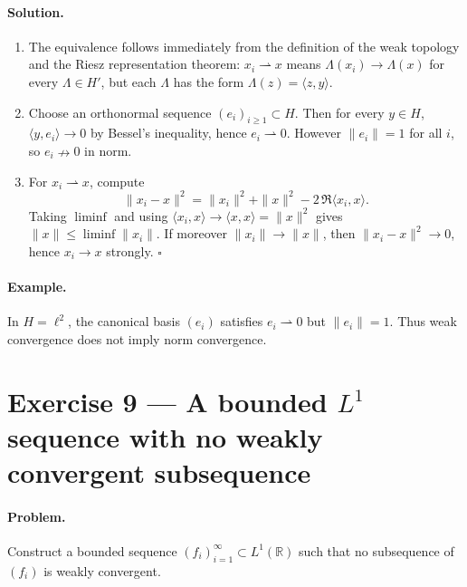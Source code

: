 \documentclass[12pt,a4paper]{article}
\newcommand{\qed}{\hfill$\square$}
\theoremstyle{plain}
\theoremstyle{definition}
\theoremstyle{remark}
\theoremstyle{remark}
\theoremstyle{definition}
\begin{document}
	\paragraph{Solution.}
	\begin{enumerate}[label=(\roman*)]
		\item The equivalence follows immediately from the definition of the weak topology
		and the Riesz representation theorem:
		$x_i\rightharpoonup x$ means
		$\Lambda(x_i)\to\Lambda(x)$ for every $\Lambda\in H'$,
		but each $\Lambda$ has the form $\Lambda(z)=\langle z,y\rangle$.
		
		\item Choose an orthonormal sequence $(e_i)_{i\ge1}\subset H$.
		Then for every $y\in H$,
		$\langle y,e_i\rangle\to0$ by Bessel’s inequality,
		hence $e_i\rightharpoonup0$.
		However $\|e_i\|=1$ for all $i$,
		so $e_i\nrightarrow0$ in norm.
		
		\item For $x_i\rightharpoonup x$, compute
		\[
		\|x_i-x\|^2=\|x_i\|^2+\|x\|^2-2\,\Re\langle x_i,x\rangle .
		\]
		Taking $\liminf$ and using
		$\langle x_i,x\rangle\to\langle x,x\rangle=\|x\|^2$ gives
		$\|x\|\le\liminf\|x_i\|$.
		If moreover $\|x_i\|\to\|x\|$, then
		$\|x_i-x\|^2\to0$,
		hence $x_i\to x$ strongly.
		\qed
	\end{enumerate}
	
	\paragraph{Example.}
	In $H=\ell^2$, the canonical basis $(e_i)$ satisfies $e_i\rightharpoonup0$
	but $\|e_i\|=1$.  Thus weak convergence does not imply norm convergence.
	
	\bigskip
	
	\section*{Exercise 9 — A bounded $L^1$ sequence with no weakly convergent subsequence}
	
	\paragraph{Problem.}
	Construct a bounded sequence $(f_i)_{i=1}^\infty\subset L^1(\mathbb R)$
	such that no subsequence of $(f_i)$ is weakly convergent.
	
\end{document}
